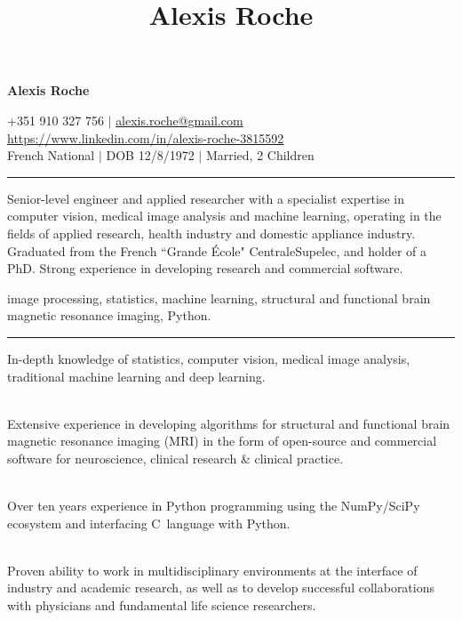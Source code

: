 \documentclass[english,10pt,a4paper]{scrartcl}
\title{Alexis Roche}
\author{}
\date{}
\newcommand{\heading}[1]{\vspace*{.75cm}\noindent{\Large{#1}}\vspace*{-.25cm}\newline\noindent\rule{\textwidth}{0.8pt}\vspace*{.25cm}}
\begin{document}


\begin{flushright} 
{\huge {\bf Alexis Roche}}\\
\begin{small}
+351 910 327 756 $\mid$ \url{alexis.roche@gmail.com}\\
\url{https://www.linkedin.com/in/alexis-roche-3815592}\\
French National $\mid$ DOB 12/8/1972 $\mid$ Married, 2 Children\\
\end{small}
\end{flushright}


\heading{Professional Profile}

\noindent Senior-level engineer and applied researcher with a specialist expertise in computer vision, medical image analysis and machine learning, operating in the fields of applied research, health industry and domestic appliance industry. Graduated from the French ``Grande \'Ecole" CentraleSupelec, and holder of a PhD. Strong experience in developing research and commercial software. 

 image processing, statistics, machine learning, structural and functional brain magnetic resonance imaging, Python.



\heading{Key Skills}

 In-depth knowledge of statistics, computer vision, medical image analysis, traditional machine learning and deep learning.

\ \\
 Extensive experience in developing algorithms for structural and functional brain magnetic resonance imaging (MRI) in the form of open-source and commercial software for neuroscience, clinical research \& clinical practice. 

\ \\
 Over ten years experience in Python programming using the NumPy/SciPy ecosystem and interfacing C~language with Python.

\ \\
 Proven ability to work in multidisciplinary environments at the interface of industry and academic research, as well as to develop successful collaborations with physicians and fundamental life science researchers.
\end{document}
